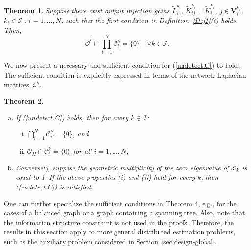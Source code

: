 \documentclass[a4paper,twocolumn]{autart}
\newtheorem{theorem}{Theorem}
\begin{document}
\begin{theorem}\label{U7.prop1}
Suppose there exist output injection gains 
${\tilde L}_i^{k_i}$, ${\tilde K}_{ij}^{k_i}={\tilde K}_i^{k_i}$, $j\in
\mathbf{V}_i^{k_i}$, 
$k_i\in\mathcal{I}_i$, $i=1,\ldots,N$, 
such that the first condition in Definition~\ref{Def1}(i) holds. Then, 
\begin{equation}
  \label{undetect.C}
\bar{\mathcal{O}}^k\cap \prod_{i=1}^N\mathcal{C}_i^k =\{0\} \quad \forall k\in 
\mathcal{I}.
\end{equation}
\end{theorem}

We now present a necessary and sufficient condition for (\ref{undetect.C})
to hold. The sufficient condition is explicitly expressed in terms of the
network Laplacian matrices $\mathcal{L}^k$.   

\begin{theorem}\label{U7.prop.2}
\begin{enumerate}[(a)]
\item
If (\ref{undetect.C}) holds, then 
for every $k\in\mathcal{I}$:
\begin{enumerate}[(i)]
\item
$\bigcap_{i=1}^N \mathcal{C}_i^k=\{0\}$, and
\item 
$\mathcal{O}_H\cap \mathcal{C}_i^k=\{0\}$ for all $i=1,\ldots,N$;
\end{enumerate}
\item
Conversely, suppose the geometric multiplicity of
the zero eigenvalue of $\mathcal{L}_k$ is equal to
1. If the above properties (i) and (ii) hold for every
$k$, then (\ref{undetect.C}) is satisfied. 
\end{enumerate}
\end{theorem}  

One can further specialize the sufficient conditions in Theorem 4, e.g.,
for the cases of a balanced graph or a graph containing a spanning tree. 
Also, note that the information structure constraint is not used
in the proofs. Therefore, the results in this section apply to more general
distributed estimation problems, such as the auxiliary problem
considered in Section~\ref{sec:design-global}.    
\end{document}
